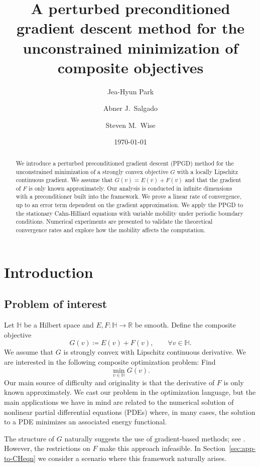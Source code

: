 \documentclass{amsart}
\title[PPGD]{A perturbed preconditioned gradient descent method for the unconstrained minimization of composite objectives}
\author{Jea-Hyun Park}
\author{Abner J.~Salgado}
\author{Steven M.~Wise}
\date{\today}
\newcommand{\HH}{\mathbb{H}}
\newcommand{\RR}{\mathbb{R}}
\theoremstyle{definition}
\begin{document}
	\maketitle

	\begin{abstract}
We introduce a perturbed preconditioned gradient descent (PPGD) method for the unconstrained minimization of a strongly convex objective $G$ with a locally Lipschitz continuous gradient. We assume that $G(v)=E(v)+F(v)$ and that the gradient of $F$ is only known approximately. Our analysis is conducted in infinite dimensions with a preconditioner built into the framework. We prove a linear rate of convergence, up to an error term dependent on the gradient approximation. We apply the PPGD to the stationary Cahn-Hilliard equations with variable mobility under periodic boundary conditions. Numerical experiments are presented to validate the theoretical convergence rates and explore how the mobility affects the computation.
	\end{abstract}


	\section{Introduction}

	\subsection{Problem of interest}
	\label{sec:prob-of-interest}

Let $\HH$ be a Hilbert space and $E,F:\HH \to \RR$ be smooth. Define the composite objective
\begin{equation}
\label{eq:GisComposite}
  G(v) \coloneqq E(v) + F(v), \qquad \forall v \in \HH.
\end{equation}
We assume that $G$ is strongly convex with Lipschitz continuous derivative. We are interested in the following composite optimization problem: Find
\begin{equation}
	\label{eqn:minimization}
	\min_{v \in \HH} G(v).
\end{equation}
Our main source of difficulty and originality is that the derivative of $F$ is only known approximately. We cast our problem in the optimization language, but the main applications we have in mind are related to the numerical solution of nonlinear partial differential equations (PDEs) where, in many cases, the solution to a PDE minimizes an associated energy functional.

The structure of $G$ naturally suggests the use of gradient-based methods; see \cite{nesterov2018lectures, wise2020FASD, feng2017PSD, psw2021PAGD}. However, the restrictions on $F$ make this approach infeasible. In Section~\ref{sec:app-to-CHeqn} we consider a scenario where this framework naturally arises.
\end{document}
